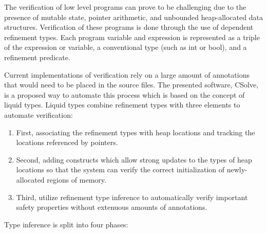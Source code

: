 
\usepackage{algorithm}
\usepackage{listings}
\usepackage{graphicx,amssymb,amsmath}
\usepackage{epstopdf}
\sloppy

\oddsidemargin 0in
\evensidemargin 0in
\textwidth 6.5in
\topmargin -0.5in
\textheight 9.0in




\pagestyle{myheadings}  %
	 	
The verification of low level programs can prove to be challenging due to the presence of mutable state, pointer arithmetic, and unbounded heap-allocated data structures. Verification of these programs is done through the use of dependent refinement types.  Each program variable and expression is represented as a triple of the expression or variable, a conventional type (such as int or bool), and a refinement predicate.

Current implementations of verification rely on a large amount of annotations that would need to be placed in the source files. The presented software, CSolve, is a proposed way to automate this process which is based on the concept of liquid types. Liquid types combine refinement types with three elements to automate verification:

\begin{enumerate}
	\item First, associating the refinement types with heap locations and tracking the locations referenced by pointers.
	\item Second, adding constructs which allow strong updates to the types of heap locations so that the system can verify the correct initialization of newly-allocated regions of memory.
	\item Third, utilize refinement type inference to automatically verify important safety properties without extenuous amounts of annotations.
\end{enumerate}

Type inference is split into four phases:

\begin{enumerate}

\end{enumerate}



